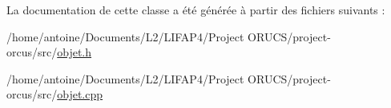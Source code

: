 La documentation de cette classe a été générée à partir des fichiers suivants \+:\begin{DoxyCompactItemize}
\item 
/home/antoine/\+Documents/\+L2/\+L\+I\+F\+A\+P4/\+Project O\+R\+U\+C\+S/project-\/orcus/src/\hyperlink{objet_8h}{objet.\+h}\item 
/home/antoine/\+Documents/\+L2/\+L\+I\+F\+A\+P4/\+Project O\+R\+U\+C\+S/project-\/orcus/src/\hyperlink{objet_8cpp}{objet.\+cpp}\end{DoxyCompactItemize}
